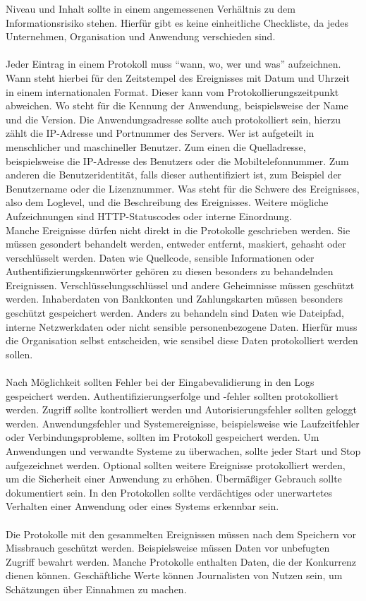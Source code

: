 Niveau und Inhalt sollte in einem angemessenen Verhältnis zu dem Informationsrisiko stehen.
Hierfür gibt es keine einheitliche Checkliste, da jedes Unternehmen, Organisation und Anwendung verschieden sind.
\\
\\
Jeder Eintrag in einem Protokoll muss \enquote{wann, wo, wer und was} aufzeichnen.
Wann steht hierbei für den Zeitstempel des Ereignisses mit Datum und Uhrzeit in einem internationalen Format.
Dieser kann vom Protokollierungszeitpunkt abweichen.
Wo steht für die Kennung der Anwendung, beispielsweise der Name und die Version.
Die Anwendungsadresse sollte auch protokolliert sein, hierzu zählt die IP-Adresse und Portnummer des Servers.
Wer ist aufgeteilt in menschlicher und maschineller Benutzer.
Zum einen die Quelladresse, beispielsweise die IP-Adresse des Benutzers oder die Mobiltelefonnummer.
Zum anderen die Benutzeridentität, falls dieser authentifiziert ist, zum Beispiel der Benutzername oder die Lizenznummer.
Was steht für die Schwere des Ereignisses, also dem Loglevel, und die Beschreibung des Ereignisses.
Weitere mögliche Aufzeichnungen sind HTTP-Statuscodes oder interne Einordnung.
\\
Manche Ereignisse dürfen nicht direkt in die Protokolle geschrieben werden.
Sie müssen gesondert behandelt werden, entweder entfernt, maskiert, gehasht oder verschlüsselt werden.
Daten wie Quellcode, sensible Informationen oder Authentifizierungskennwörter gehören zu diesen besonders zu behandelnden Ereignissen.
Verschlüsselungsschlüssel und andere Geheimnisse müssen geschützt werden.
Inhaberdaten von Bankkonten und Zahlungskarten müssen besonders geschützt gespeichert werden.
Anders zu behandeln sind Daten wie Dateipfad, interne Netzwerkdaten oder nicht sensible personenbezogene Daten.
Hierfür muss die Organisation selbst entscheiden, wie sensibel diese Daten protokolliert werden sollen.
\\
\\
Nach Möglichkeit sollten Fehler bei der Eingabevalidierung in den Logs gespeichert werden.
Authentifizierungserfolge und -fehler sollten protokolliert werden.
Zugriff sollte kontrolliert werden und Autorisierungsfehler sollten geloggt werden.
Anwendungsfehler und Systemereignisse, beispielsweise wie Laufzeitfehler oder Verbindungsprobleme, sollten im Protokoll gespeichert werden.
Um Anwendungen und verwandte Systeme zu überwachen, sollte jeder Start und Stop aufgezeichnet werden.
Optional sollten weitere Ereignisse protokolliert werden, um die Sicherheit einer Anwendung zu erhöhen.
Übermäßiger Gebrauch sollte dokumentiert sein.
In den Protokollen sollte verdächtiges oder unerwartetes Verhalten einer Anwendung oder eines Systems erkennbar sein.
\\
\\
Die Protokolle mit den gesammelten Ereignissen müssen nach dem Speichern vor Missbrauch geschützt werden.
Beispielsweise müssen Daten vor unbefugten Zugriff bewahrt werden.
Manche Protokolle enthalten Daten, die der Konkurrenz dienen können.
Geschäftliche Werte können Journalisten von Nutzen sein, um Schätzungen über Einnahmen zu machen.\autocite{ip-insider, ait, owasp}


